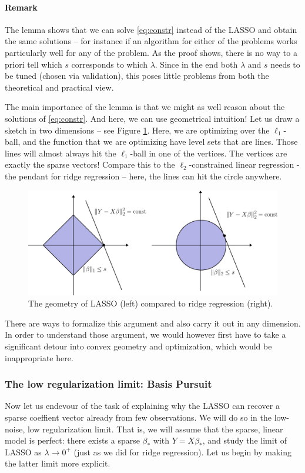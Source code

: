 \documentclass{article}
\begin{document}
\paragraph{Remark} The lemma shows that we can solve \eqref{eq:constr} instead of the LASSO and obtain the same solutions -- for instance if an algorithm for either of the problems works particularly well for any of the problem. As the proof shows, there is no way to a priori tell which $s$ corresponds to which $\lambda$. Since in the end both $\lambda$ and $s$ needs to be tuned (chosen via validation), this poses little problems from both the theoretical and practical view.

\smallskip 
The main importance of the  lemma is that we might as well reason about the solutions of \eqref{eq:constr}. And here, we can use geometrical intuition! Let us draw a sketch in two dimensions -- see Figure \ref{fig:l1l2}. Here, we are optimizing over the $\ell_1$-ball, and the function that we are optimizing have level sets that are lines. Those lines will almost always hit the $\ell_1$-ball in one of the vertices. The vertices are exactly the sparse vectors! Compare this to the $\ell_2$-constrained linear regression - the pendant for ridge regression -- here, the lines can hit the circle anywhere.

\begin{figure}
    \centering
    \includegraphics[width=0.75\linewidth]{graphics/l1_vs_l2.pdf}
    \caption{The geometry of LASSO (left) compared to ridge regression (right).}
    \label{fig:l1l2}
\end{figure}

There are ways to formalize this argument and also carry it out in any dimension. In order to understand those argument, we would however first have to take a significant detour into convex geometry and optimization, which would be inappropriate here.

\subsubsection{The low regularization limit: Basis Pursuit} Now let us endevour of the task of explaining why the LASSO can recover a sparse coeffient vector already from few observations. We will do so in the low-noise, low regularization limit. That is, we will assume that the sparse, linear model is perfect: there exists a sparse $\beta_*$ with $Y= X\beta_*$, and study the limit of LASSO as $\lambda \to 0^+$ (just as we did for ridge regression). Let us begin by making the latter limit more explicit.
\end{document}

